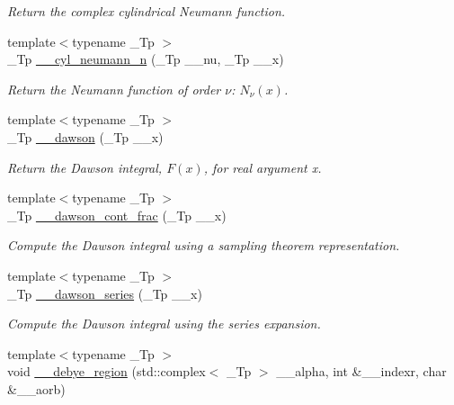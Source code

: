\begin{DoxyCompactItemize}
\begin{DoxyCompactList}\small\item\em Return the complex cylindrical Neumann function. \end{DoxyCompactList}\item 
{\footnotesize template$<$typename \+\_\+\+Tp $>$ }\\\+\_\+\+Tp \hyperlink{namespacestd_1_1____detail_ae414a6b5c064dc2b9b9a3b28e6cec813}{\+\_\+\+\_\+cyl\+\_\+neumann\+\_\+n} (\+\_\+\+Tp \+\_\+\+\_\+nu, \+\_\+\+Tp \+\_\+\+\_\+x)
\begin{DoxyCompactList}\small\item\em Return the Neumann function of order $ \nu $\+: $ N_{\nu}(x) $. \end{DoxyCompactList}\item 
{\footnotesize template$<$typename \+\_\+\+Tp $>$ }\\\+\_\+\+Tp \hyperlink{namespacestd_1_1____detail_a6384fb4c5af31b41a38c120869a548c7}{\+\_\+\+\_\+dawson} (\+\_\+\+Tp \+\_\+\+\_\+x)
\begin{DoxyCompactList}\small\item\em Return the Dawson integral, $ F(x) $, for real argument {\ttfamily x}. \end{DoxyCompactList}\item 
{\footnotesize template$<$typename \+\_\+\+Tp $>$ }\\\+\_\+\+Tp \hyperlink{namespacestd_1_1____detail_a3ad3b7b4dcebdf69778dbf7a5ba2427c}{\+\_\+\+\_\+dawson\+\_\+cont\+\_\+frac} (\+\_\+\+Tp \+\_\+\+\_\+x)
\begin{DoxyCompactList}\small\item\em Compute the Dawson integral using a sampling theorem representation. \end{DoxyCompactList}\item 
{\footnotesize template$<$typename \+\_\+\+Tp $>$ }\\\+\_\+\+Tp \hyperlink{namespacestd_1_1____detail_a033d91cc1c67280385ff3d1d809a21d1}{\+\_\+\+\_\+dawson\+\_\+series} (\+\_\+\+Tp \+\_\+\+\_\+x)
\begin{DoxyCompactList}\small\item\em Compute the Dawson integral using the series expansion. \end{DoxyCompactList}\item 
{\footnotesize template$<$typename \+\_\+\+Tp $>$ }\\void \hyperlink{namespacestd_1_1____detail_a3212c0a136417e862f2ed8e9684e053c}{\+\_\+\+\_\+debye\+\_\+region} (std\+::complex$<$ \+\_\+\+Tp $>$ \+\_\+\+\_\+alpha, int \&\+\_\+\+\_\+indexr, char \&\+\_\+\+\_\+aorb)

\end{DoxyCompactItemize}
